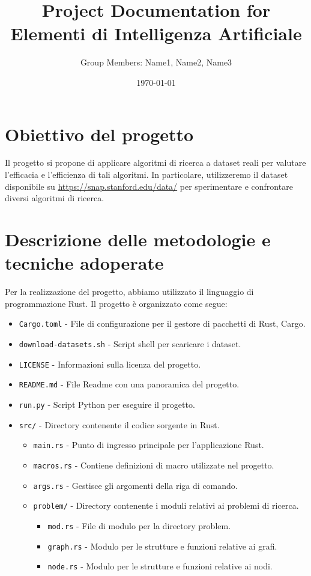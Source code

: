 \documentclass{article}
\title{Project Documentation for Elementi di Intelligenza Artificiale}
\author{Group Members: Name1, Name2, Name3}
\date{\today}
\begin{document}
\maketitle

\tableofcontents

\section{Obiettivo del progetto}
Il progetto si propone di applicare algoritmi di ricerca a dataset reali per valutare l'efficacia e l'efficienza di tali algoritmi. In particolare, utilizzeremo il dataset disponibile su \url{https://snap.stanford.edu/data/} per sperimentare e confrontare diversi algoritmi di ricerca.

\section{Descrizione delle metodologie e tecniche adoperate}
Per la realizzazione del progetto, abbiamo utilizzato il linguaggio di programmazione Rust. Il progetto è organizzato come segue:
\begin{itemize}
  \item \texttt{Cargo.toml} - File di configurazione per il gestore di pacchetti di Rust, Cargo.
  \item \texttt{download-datasets.sh} - Script shell per scaricare i dataset.
  \item \texttt{LICENSE} - Informazioni sulla licenza del progetto.
  \item \texttt{README.md} - File Readme con una panoramica del progetto.
  \item \texttt{run.py} - Script Python per eseguire il progetto.
  \item \texttt{src/} - Directory contenente il codice sorgente in Rust.
        \begin{itemize}
          \item \texttt{main.rs} - Punto di ingresso principale per l'applicazione Rust.
          \item \texttt{macros.rs} - Contiene definizioni di macro utilizzate nel progetto.
          \item \texttt{args.rs} - Gestisce gli argomenti della riga di comando.
          \item \texttt{problem/} - Directory contenente i moduli relativi ai problemi di ricerca.
                \begin{itemize}
                  \item \texttt{mod.rs} - File di modulo per la directory problem.
                  \item \texttt{graph.rs} - Modulo per le strutture e funzioni relative ai grafi.
                  \item \texttt{node.rs} - Modulo per le strutture e funzioni relative ai nodi.
                \end{itemize}
        \end{itemize}
\end{itemize}
\end{document}
